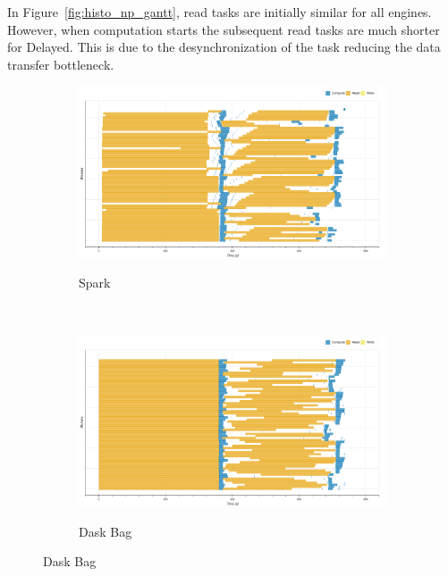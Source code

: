 \documentclass[conference]{IEEEtran}
\begin{document}
In Figure~\ref{fig:histo_np_gantt}, read tasks are initially similar for all
engines. However, when computation starts the subsequent read tasks are much
shorter for Delayed. This is due to the desynchronization of the task reducing the
data transfer bottleneck.



\begin{figure}[!tb]
    \centering
    \begin{subfigure}[b]{\columnwidth}
        \href{https://mathdugre.github.io/paper-big-data-engines/spark-histo_np-baseline.html}{
        \includegraphics[clip,width=\columnwidth,
        height=0.15\textheight]{images/spark_histo_np_gantt.png}}
        \caption{Spark}\label{fig:histo_np_spark_gantt}
    \end{subfigure}
    \\
    \begin{subfigure}[b]{\columnwidth}
        \href{https://mathdugre.github.io/paper-big-data-engines/dask-bag-histo_np-baseline.html}{
        \includegraphics[clip,width=\columnwidth,
        height=0.15\textheight]{images/bag_histo_np_gantt.png}}
        \caption{Dask Bag}\label{fig:histo_np_dask_bag_gantt}

\end{subfigure}
\end{figure}
\end{document}
